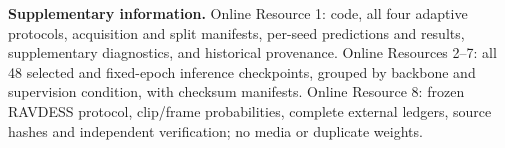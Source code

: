 \documentclass[pdflatex,sn-mathphys-num]{sn-jnl}
\begin{document}
\noindent\textbf{Supplementary information.} Online Resource 1: code, all four adaptive protocols, acquisition and split manifests, per-seed predictions and results, supplementary diagnostics, and historical provenance. Online Resources 2--7: all 48 selected and fixed-epoch inference checkpoints, grouped by backbone and supervision condition, with checksum manifests. Online Resource 8: frozen RAVDESS protocol, clip/frame probabilities, complete external ledgers, source hashes and independent verification; no media or duplicate weights.

\FloatBarrier

\end{document}
